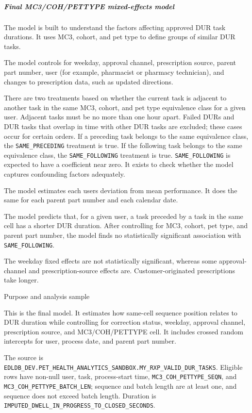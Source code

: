 \documentclass[
]{article}
\begin{document}
\subparagraph{Final MC3/COH/PETTYPE mixed-effects
model}\label{final-mc3cohpettype-mixed-effects-model}

The model is built to understand the factors affecting approved DUR task
durations. It uses MC3, cohort, and pet type to define groups of similar
DUR tasks.

The model controls for weekday, approval channel, prescription source,
parent part number, user (for example, pharmacist or pharmacy
technician), and changes to prescription data, such as updated
directions.

There are two treatments based on whether the current task is adjacent
to another task in the same MC3, cohort, and pet type equivalence class
for a given user. Adjacent tasks must be no more than one hour apart.
Failed DURs and DUR tasks that overlap in time with other DUR tasks are
excluded; these cases occur for certain orders. If a preceding task
belongs to the same equivalence class, the \texttt{SAME\_PRECEDING}
treatment is true. If the following task belongs to the same equivalence
class, the \texttt{SAME\_FOLLOWING} treatment is true.
\texttt{SAME\_FOLLOWING} is expected to have a coefficient near zero. It
exists to check whether the model captures confounding factors
adequately.

The model estimates each user\textquotesingle s deviation from mean
performance. It does the same for each parent part number and each
calendar date.

The model predicts that, for a given user, a task preceded by a task in
the same cell has a shorter DUR duration. After controlling for MC3,
cohort, pet type, and parent part number, the model finds no
statistically significant association with \texttt{SAME\_FOLLOWING}.

The weekday fixed effects are not statistically significant, whereas
some approval-channel and prescription-source effects are.
Customer-originated prescriptions take longer.

Purpose and analysis sample

This is the final model. It estimates how same-cell sequence position
relates to DUR duration while controlling for correction status,
weekday, approval channel, prescription source, and MC3/COH/PETTYPE
cell. It includes crossed random intercepts for user, process date, and
parent part number.

The source is
\texttt{EDLDB\_DEV.PET\_HEALTH\_ANALYTICS\_SANDBOX.MY\_RXP\_VALID\_DUR\_TASKS}.
Eligible rows have non-null user, task, process-start time,
\texttt{MC3\_COH\_PETTYPE\_SEQN}, and
\texttt{MC3\_COH\_PETTYPE\_BATCH\_LEN}; sequence and batch length are at
least one, and sequence does not exceed batch length. Duration is
\texttt{IMPUTED\_DWELL\_IN\_PROGRESS\_TO\_CLOSED\_SECONDS}.
\end{document}
